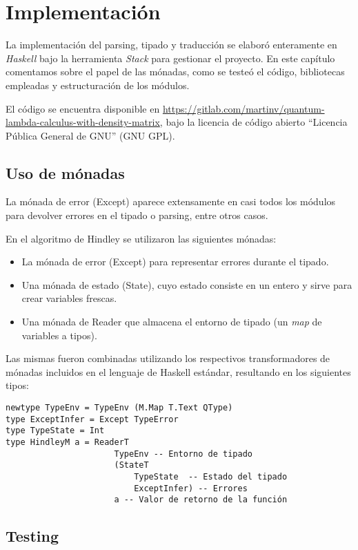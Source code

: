 
\chapter{Implementación}\label{ch:implementacion}

La implementación del parsing, tipado y traducción se elaboró enteramente en \emph{Haskell} bajo la herramienta \emph{Stack} para gestionar el proyecto. En este capítulo comentamos sobre el papel de las mónadas, como se testeó el código, bibliotecas empleadas y estructuración de los módulos.

El código se encuentra disponible en \url{https://gitlab.com/martinv/quantum-lambda-calculus-with-density-matrix}, bajo la licencia de código abierto ``Licencia Pública General de GNU'' (GNU GPL).

\section{Uso de mónadas}
La mónada de error (\textsf{Except}) aparece extensamente en casi todos los módulos para devolver errores en el tipado o parsing, entre otros casos.


En el algoritmo de Hindley se utilizaron las siguientes mónadas:
\begin{itemize}
    \item La mónada de error (\textsf{Except}) para representar errores durante el tipado.
    \item Una mónada de estado (\textsf{State}), cuyo estado consiste en un entero y sirve para crear variables frescas.
    \item Una mónada de \textsf{Reader} que almacena el entorno de tipado (un \emph{map} de variables a tipos).
\end{itemize}
Las mismas fueron combinadas utilizando los respectivos transformadores de mónadas incluidos en el lenguaje de Haskell estándar, resultando en los siguientes tipos:
\begin{verbatim}
newtype TypeEnv = TypeEnv (M.Map T.Text QType)
type ExceptInfer = Except TypeError
type TypeState = Int
type HindleyM a = ReaderT
                      TypeEnv -- Entorno de tipado
                      (StateT
                          TypeState  -- Estado del tipado
                          ExceptInfer) -- Errores
                      a -- Valor de retorno de la función
\end{verbatim}


\section{Testing}

